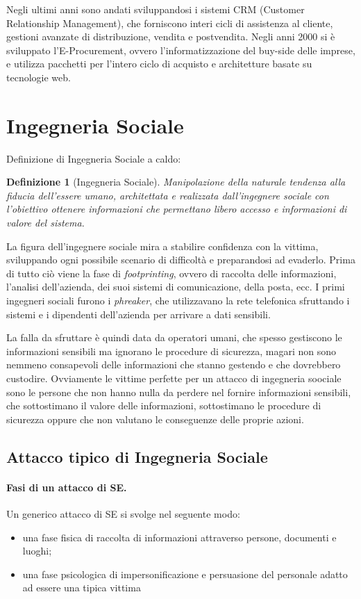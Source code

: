 \documentclass[a4paper, 11pt]{article}
\newtheorem{definit}{Definizione}[subsection]
\begin{document}
	Negli ultimi anni sono andati sviluppandosi i sistemi CRM (Customer Relationship Management), che forniscono interi cicli di assistenza al cliente, gestioni avanzate di distribuzione, vendita e postvendita. Negli anni 2000 si è sviluppato l'E-Procurement, ovvero l'informatizzazione del buy-side delle imprese, e utilizza pacchetti per l'intero ciclo di acquisto e architetture basate su tecnologie web.
	
	\section{Ingegneria Sociale}
	Definizione di Ingegneria Sociale a caldo:\begin{definit}[Ingegneria Sociale]
		Manipolazione della naturale tendenza alla fiducia dell’essere umano, architettata e realizzata dall’ingegnere sociale con l’obiettivo ottenere informazioni che permettano libero accesso e informazioni di valore del sistema.
	\end{definit}

	La figura dell'ingegnere sociale mira a stabilire confidenza con la vittima, sviluppando ogni possibile scenario di difficoltà e preparandosi ad evaderlo. Prima di tutto ciò viene la fase di \textit{footprinting}, ovvero di raccolta delle informazioni, l'analisi dell'azienda, dei suoi sistemi di comunicazione, della posta, ecc. I primi ingegneri sociali furono i \textit{phreaker}, che utilizzavano la rete telefonica sfruttando i sistemi e i dipendenti dell'azienda per arrivare a dati sensibili.
	
	La falla da sfruttare è quindi data da operatori umani, che spesso gestiscono le informazioni sensibili ma ignorano le procedure di sicurezza, magari non sono nemmeno consapevoli delle informazioni che stanno gestendo e che dovrebbero custodire. 
	Ovviamente le vittime perfette per un attacco di ingegneria soociale sono le persone che non hanno nulla da perdere nel fornire informazioni sensibili, che sottostimano il valore delle informazioni, sottostimano le procedure di sicurezza oppure che non valutano le conseguenze delle proprie azioni.
	
	\subsection{Attacco tipico di Ingegneria Sociale}
	\paragraph{Fasi di un attacco di SE.} Un generico attacco di SE si svolge nel seguente modo: \begin{itemize}
		\item una fase fisica di raccolta di informazioni attraverso persone, documenti e luoghi;
		\item una fase psicologica di impersonificazione e persuasione del personale adatto ad essere una tipica vittima
	\end{itemize}
\end{document}
